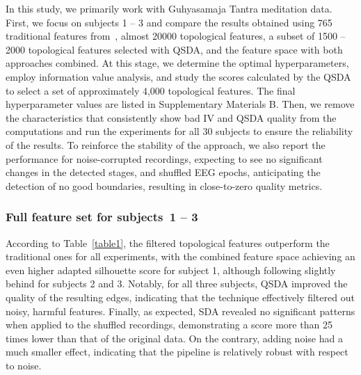 \documentclass[pdflatex,sn-basic,Numbered]{sn-jnl}
\begin{document}
In this study, we primarily work with Guhyasamaja Tantra meditation data. First, we focus on subjects 1 -- 3 and compare the results obtained using 765 traditional features from~\cite{SDA}, almost 20000 topological features, a subset of 1500 -- 2000 topological features selected with QSDA, and the feature space with both approaches combined. At this stage, we determine the optimal hyperparameters, employ information value analysis, and study the scores calculated by the QSDA to select a set of approximately 4,000 topological features. The final hyperparameter values are listed in Supplementary Materials B. Then, we remove the characteristics that consistently show bad IV and QSDA quality from the computations and run the experiments for all 30 subjects to ensure the reliability of the results. To reinforce the stability of the approach, we also report the performance for noise-corrupted recordings, expecting to see no significant changes in the detected stages, and shuffled EEG epochs, anticipating the detection of no good boundaries, resulting in close-to-zero quality metrics.

\subsubsection{Full feature set for subjects~1 -- 3}

According to Table~\ref{table1}, the filtered topological features outperform the traditional ones for all experiments, with the combined feature space achieving an even higher adapted silhouette score for subject 1, although following slightly behind for subjects 2 and 3. Notably, for all three subjects, QSDA improved the quality of the resulting edges, indicating that the technique effectively filtered out noisy, harmful features. Finally, as expected, SDA revealed no significant patterns when applied to the shuffled recordings, demonstrating a score more than 25 times lower than that of the original data. On the contrary, adding noise had a much smaller effect, indicating that the pipeline is relatively robust with respect to noise.
\end{document}
